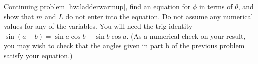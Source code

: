 Continuing problem \ref{hw:ladderwarmup}, find an equation for
$\phi $ in terms of $\theta $, and show that $m$ and $L$ do
not enter into the equation. Do not assume any numerical
values for any of the variables. You will need the trig
identity $\sin (a-b)=\sin a \cos b - \sin b \cos a$.
(As a numerical check on your result, you may wish to
check that the angles given in part b of the previous
problem satisfy your equation.)
\answercheck
